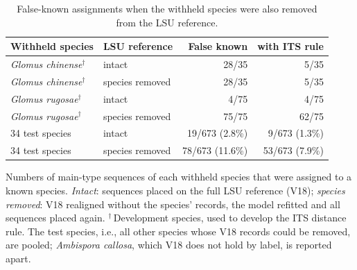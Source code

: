 \begin{table}[htbp]\centering
\begin{threeparttable}
\caption{False-known assignments when the withheld species were also removed from the LSU reference.}
\label{tab:external}
\small
\begin{tabular}{llrr}
\toprule
Withheld species & LSU reference & False known & with ITS rule\\
\midrule
\emph{Glomus chinense}$^{\dagger}$ & intact & 28/35 & 5/35\\
\emph{Glomus chinense}$^{\dagger}$ & species removed & 28/35 & 5/35\\
\emph{Glomus rugosae}$^{\dagger}$ & intact & 4/75 & 4/75\\
\emph{Glomus rugosae}$^{\dagger}$ & species removed & 75/75 & 62/75\\
\midrule
34 test species & intact & 19/673 (2.8\%) & 9/673 (1.3\%)\\
34 test species & species removed & 78/673 (11.6\%) & 53/673 (7.9\%)\\
\bottomrule
\end{tabular}
\begin{tablenotes}\footnotesize
\item Numbers of main-type sequences of each withheld species that were assigned to a known species.
\emph{Intact}: sequences placed on the full LSU reference (V18); \emph{species removed}: V18 realigned without
the species' records, the model refitted and all sequences placed again. $^{\dagger}$\,Development species, used
to develop the ITS distance rule. The test species, i.e., all other species whose V18 records could be removed,
are pooled; \emph{Ambispora callosa}, which V18 does not hold by label, is reported apart.
\end{tablenotes}
\end{threeparttable}
\end{table}
